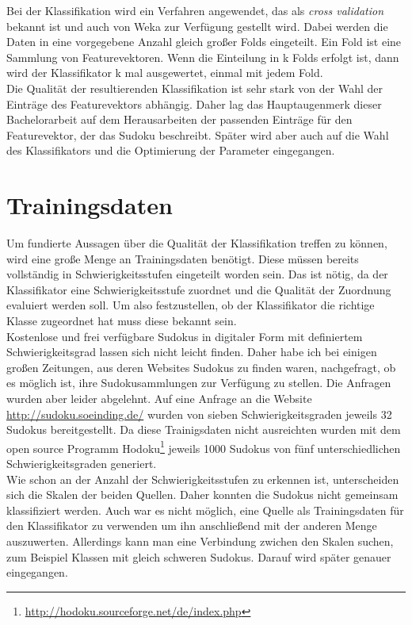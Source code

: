 \documentclass[accentcolor=tud6b,11pt,paper=a4]{tudreport}
\begin{document}
Bei der Klassifikation wird ein Verfahren angewendet, das als \textit{cross validation} bekannt ist und auch von Weka zur Verfügung gestellt wird. Dabei werden die Daten in eine vorgegebene Anzahl gleich großer Folds eingeteilt. Ein Fold ist eine Sammlung von Featurevektoren. Wenn die Einteilung in k Folds erfolgt ist, dann wird der Klassifikator k mal ausgewertet, einmal mit jedem Fold.\\
Die Qualität der resultierenden Klassifikation ist sehr stark von der Wahl der Einträge des Featurevektors abhängig. Daher lag das Hauptaugenmerk dieser Bachelorarbeit auf dem Herausarbeiten der passenden Einträge für den Featurevektor, der das Sudoku beschreibt. Später wird aber auch auf die Wahl des Klassifikators und die Optimierung der Parameter eingegangen.\\

\chapter{Trainingsdaten}
Um fundierte Aussagen über die Qualität der Klassifikation treffen zu können, wird eine große Menge an Trainingsdaten benötigt. Diese müssen bereits vollständig in Schwierigkeitsstufen eingeteilt worden sein. Das ist nötig, da der Klassifikator eine Schwierigkeitsstufe zuordnet und die Qualität der Zuordnung evaluiert werden soll. Um also festzustellen, ob der Klassifikator die richtige Klasse zugeordnet hat muss diese bekannt sein.\\
Kostenlose und frei verfügbare Sudokus in digitaler Form mit definiertem Schwierigkeitsgrad lassen sich nicht leicht finden. Daher habe ich bei einigen großen Zeitungen, aus deren Websites Sudokus zu finden waren, nachgefragt, ob es möglich ist, ihre Sudokusammlungen zur Verfügung zu stellen. Die Anfragen wurden aber leider abgelehnt. Auf eine Anfrage an die Website \url{http://sudoku.soeinding.de/} wurden von sieben Schwierigkeitsgraden jeweils 32 Sudokus bereitgestellt. Da diese Trainigsdaten nicht ausreichten wurden mit dem open source Programm Hodoku\footnote{\url{http://hodoku.sourceforge.net/de/index.php}} jeweils 1000 Sudokus von fünf unterschiedlichen Schwierigkeitsgraden generiert.\\
Wie schon an der Anzahl der Schwierigkeitsstufen zu erkennen ist, unterscheiden sich die Skalen der beiden Quellen. Daher konnten die Sudokus nicht gemeinsam klassifiziert werden. Auch war es nicht möglich, eine Quelle als Trainingsdaten für den Klassifikator zu verwenden um ihn anschließend mit der anderen Menge auszuwerten. Allerdings kann man eine Verbindung zwichen den Skalen suchen, zum Beispiel Klassen mit gleich schweren Sudokus. Darauf wird später genauer eingegangen.\\
\end{document}
